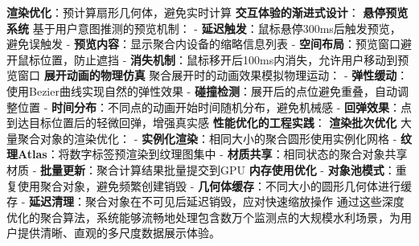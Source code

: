 {{{\textbf{渲染优化}：预计算扇形几何体，避免实时计算 \textbf{交互体验的渐进式设计}： \textbf{悬停预览系统} 基于用户意图推测的预览机制： - \textbf{延迟触发}：鼠标悬停300ms后触发预览，避免误触发 - \textbf{预览内容}：显示聚合内设备的缩略信息列表 - \textbf{空间布局}：预览窗口避开鼠标位置，防止遮挡 - \textbf{消失机制}：鼠标移开后100ms内消失，允许用户移动到预览窗口 \textbf{展开动画的物理仿真} 聚合展开时的动画效果模拟物理运动： - \textbf{弹性缓动}：使用Bezier曲线实现自然的弹性效果 - \textbf{碰撞检测}：展开后的点位避免重叠，自动调整位置 - \textbf{时间分布}：不同点的动画开始时间随机分布，避免机械感 - \textbf{回弹效果}：点到达目标位置后的轻微回弹，增强真实感 \textbf{性能优化的工程实践}： \textbf{渲染批次优化} 大量聚合对象的渲染优化： - \textbf{实例化渲染}：相同大小的聚合圆形使用实例化网格 - \textbf{纹理Atlas}：将数字标签预渲染到纹理图集中 - \textbf{材质共享}：相同状态的聚合对象共享材质 - \textbf{批量更新}：聚合计算结果批量提交到GPU \textbf{内存使用优化} - \textbf{对象池模式}：重复使用聚合对象，避免频繁创建销毁 - \textbf{几何体缓存}：不同大小的圆形几何体进行缓存 - \textbf{延迟清理}：聚合对象在不可见后延迟销毁，应对快速缩放操作 通过这些深度优化的聚合算法，系统能够流畅地处理包含数万个监测点的大规模水利场景，为用户提供清晰、直观的多尺度数据展示体验。 \hypertarget{ux672cux8282ux5c0fux7ed3}{%

}}}}
